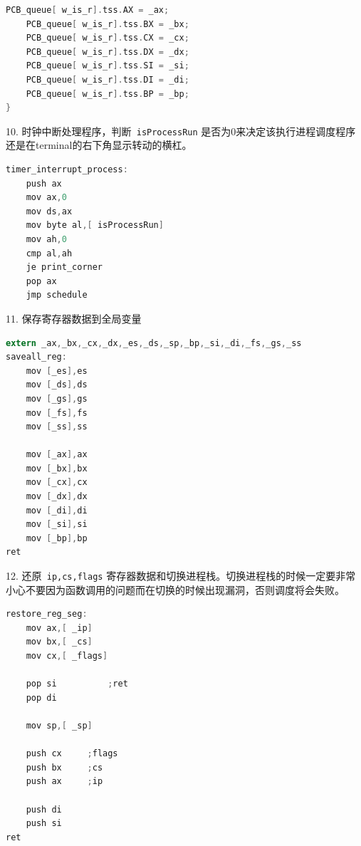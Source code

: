 \documentclass[a4paper]{article}
\begin{document}
{{{\begin{lstlisting}[language={C}]
	PCB_queue[ w_is_r].tss.AX = _ax;
	PCB_queue[ w_is_r].tss.BX = _bx;
	PCB_queue[ w_is_r].tss.CX = _cx;
	PCB_queue[ w_is_r].tss.DX = _dx;
	PCB_queue[ w_is_r].tss.SI = _si;
	PCB_queue[ w_is_r].tss.DI = _di;
	PCB_queue[ w_is_r].tss.BP = _bp;
}
\end{lstlisting}}
10. 时钟中断处理程序，判断\verb| isProcessRun| 是否为0来决定该执行进程调度程序还是在terminal的右下角显示转动的横杠。

{\scriptsize \begin{lstlisting}[language={C}]
timer_interrupt_process:
	push ax
	mov ax,0
	mov ds,ax
	mov byte al,[ isProcessRun]
	mov ah,0
	cmp al,ah
	je print_corner
	pop ax
	jmp schedule
\end{lstlisting}}
11. 保存寄存器数据到全局变量
{\scriptsize \begin{lstlisting}[language={C}]
extern _ax,_bx,_cx,_dx,_es,_ds,_sp,_bp,_si,_di,_fs,_gs,_ss
saveall_reg:
	mov [_es],es
	mov [_ds],ds
	mov [_gs],gs
	mov [_fs],fs
	mov [_ss],ss

	mov [_ax],ax
	mov [_bx],bx
	mov [_cx],cx
	mov [_dx],dx
	mov [_di],di
	mov [_si],si
	mov [_bp],bp
ret
\end{lstlisting}}
12. 还原\verb| ip,cs,flags| 寄存器数据和切换进程栈。切换进程栈的时候一定要非常小心不要因为函数调用的问题而在切换的时候出现漏洞，否则调度将会失败。
{\scriptsize \begin{lstlisting}[language={C}]
	restore_reg_seg:
	mov ax,[ _ip]
	mov bx,[ _cs]
	mov cx,[ _flags]

	pop si			;ret
	pop di

	mov sp,[ _sp]

	push cx		;flags
	push bx		;cs
	push ax		;ip

	push di
	push si
ret

\end{lstlisting}}


}	
}
\end{document}
